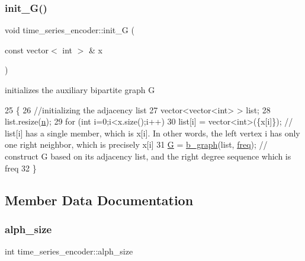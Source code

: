 \subsubsection{\texorpdfstring{init\+\_\+\+G()}{init\_G()}}
{\footnotesize\ttfamily void time\+\_\+series\+\_\+encoder\+::init\+\_\+G (\begin{DoxyParamCaption}\item[{const vector$<$ int $>$ \&}]{x }\end{DoxyParamCaption})\hspace{0.3cm}{\ttfamily [private]}}



initializes the auxiliary bipartite graph G 


\begin{DoxyCode}
25 \{
26   \textcolor{comment}{//initializing the adjacency list}
27   vector<vector<int> > list;
28   list.resize(\hyperlink{classtime__series__encoder_ab84b7528d50c495fc140f1eb50d9b539}{n});
29   \textcolor{keywordflow}{for} (\textcolor{keywordtype}{int} i=0;i<x.size();i++)
30     list[i] = vector<int>(\{x[i]\}); \textcolor{comment}{// list[i] has a single member, which is x[i]. In other words, the left
       vertex i has only one right neighbor, which is precisely x[i]}
31   \hyperlink{classtime__series__encoder_aa40f761a56f696e78e8888e50e8f45b9}{G} = \hyperlink{classb__graph}{b\_graph}(list, \hyperlink{classtime__series__encoder_ac6496aa39f28da4d8fe964c495e76057}{freq}); \textcolor{comment}{// construct G based on its adjacency list, and the right degree
       sequence which is freq}
32 \}
\end{DoxyCode}


\subsection{Member Data Documentation}
\mbox{\label{classtime__series__encoder_a7e73867e25ea5ae643bf05eaf33ea9ac}} 
\subsubsection{\texorpdfstring{alph\+\_\+size}{alph\_size}}
{\footnotesize\ttfamily int time\+\_\+series\+\_\+encoder\+::alph\+\_\+size\hspace{0.3cm}{\ttfamily [private]}}



